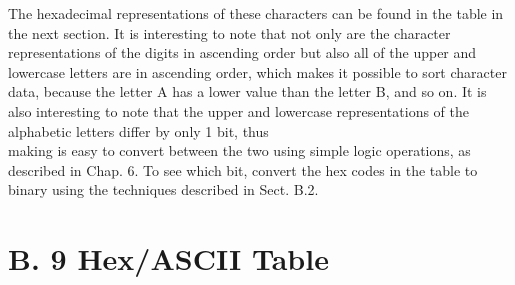 \documentclass[10pt]{article}
\begin{document}
The hexadecimal representations of these characters can be found in the table in the next section. It is interesting to note that not only are the character representations of the digits in ascending order but also all of the upper and lowercase letters are in ascending order, which makes it possible to sort character data, because the letter A has a lower value than the letter B, and so on. It is also interesting to note that the upper and lowercase representations of the alphabetic letters differ by only 1 bit, thus\\
making is easy to convert between the two using simple logic operations, as described in Chap. 6. To see which bit, convert the hex codes in the table to binary using the techniques described in Sect. B.2.

\section*{B. 9 Hex/ASCII Table}
\end{document}

